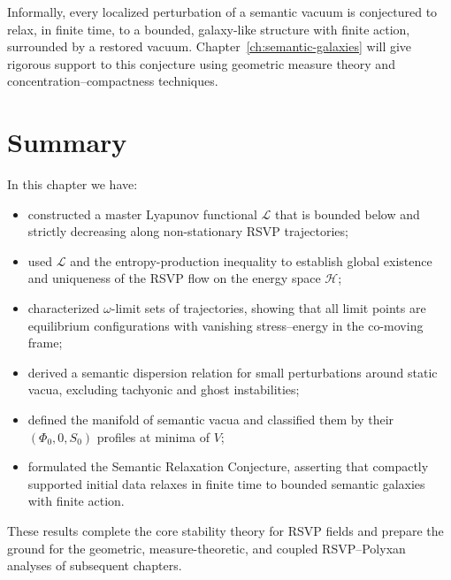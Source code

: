 Informally, every localized perturbation of a semantic vacuum is conjectured to
relax, in finite time, to a bounded, galaxy-like structure with finite action,
surrounded by a restored vacuum.  
Chapter~\ref{ch:semantic-galaxies} will give rigorous support to this
conjecture using geometric measure theory and concentration--compactness
techniques.

\section{Summary}

In this chapter we have:

\begin{itemize}
  \item constructed a master Lyapunov functional $\mathscr{L}$ that is bounded
        below and strictly decreasing along non-stationary RSVP trajectories;
  \item used $\mathscr{L}$ and the entropy-production inequality to establish
        global existence and uniqueness of the RSVP flow on the energy space
        $\mathcal{H}$;
  \item characterized $\omega$-limit sets of trajectories, showing that all
        limit points are equilibrium configurations with vanishing stress--energy
        in the co-moving frame;
  \item derived a semantic dispersion relation for small perturbations around
        static vacua, excluding tachyonic and ghost instabilities;
  \item defined the manifold of semantic vacua and classified them by their
        $(\Phi_0,0,S_0)$ profiles at minima of $V$;
  \item formulated the Semantic Relaxation Conjecture, asserting that
        compactly supported initial data relaxes in finite time to bounded
        semantic galaxies with finite action.
\end{itemize}

These results complete the core stability theory for RSVP fields and prepare
the ground for the geometric, measure-theoretic, and coupled RSVP--Polyxan
analyses of subsequent chapters.
